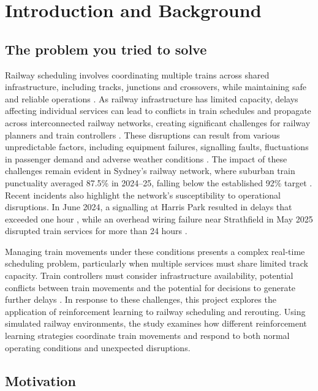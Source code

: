 \documentclass[11pt,a4paper]{article}
\begin{document}
\clearpage

\section{Introduction and Background}

\subsection{The problem you tried to solve}

Railway scheduling involves coordinating multiple trains across shared infrastructure, including tracks, junctions and crossovers, while maintaining safe and reliable operations \parencite{li2021}. As railway infrastructure has limited capacity, delays affecting individual services can lead to conflicts in train schedules and propagate across interconnected railway networks, creating significant challenges for railway planners and train controllers \parencite{li2021}. These disruptions can result from various unpredictable factors, including equipment failures, signalling faults, fluctuations in passenger demand and adverse weather conditions \parencite{li2021}. The impact of these challenges remain evident in Sydney's railway network, where suburban train punctuality averaged 87.5\% in 2024--25, falling below the established 92\% target \parencite{sydneytrains2025}. Recent incidents also highlight the network's susceptibility to operational disruptions. In June 2024, a signalling at Harris Park resulted in  delays that exceeded one hour \parencite{roberts2024}, while an overhead wiring failure near Strathfield in May 2025 disrupted train services for more than 24 hours \parencite{gorrey2025}.

Managing train movements under these conditions presents a complex real-time scheduling problem, particularly when multiple services must share limited track capacity. Train controllers must consider infrastructure availability, potential conflicts between train movements and the potential for decisions to generate further delays \parencite{zhu2019}. In response to these challenges, this project explores the application of reinforcement learning to railway scheduling and rerouting. Using simulated railway environments, the study examines how different reinforcement learning strategies coordinate train movements and respond to both normal operating conditions and unexpected disruptions.

\subsection{Motivation}
\end{document}
